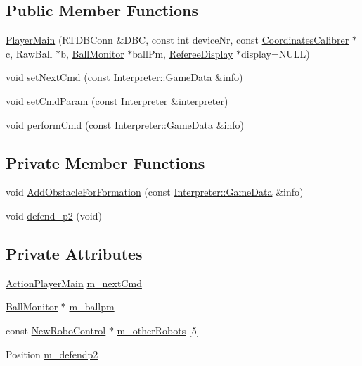\subsection*{Public Member Functions}
\begin{DoxyCompactItemize}
\item 
\hyperlink{classPlayerMain_a12957aeecc6902370f03ff2ffbb0551d}{PlayerMain} (RTDBConn \&DBC, const int deviceNr, const \hyperlink{classCoordinatesCalibrer}{CoordinatesCalibrer} $\ast$c, RawBall $\ast$b, \hyperlink{classBallMonitor}{BallMonitor} $\ast$ballPm, \hyperlink{classRefereeDisplay}{RefereeDisplay} $\ast$display=NULL)
\item 
void \hyperlink{classPlayerMain_a8f0320189df15529662c7f16d2f74084}{setNextCmd} (const \hyperlink{structInterpreter_1_1GameData}{Interpreter::GameData} \&info)
\item 
void \hyperlink{classPlayerMain_a5c4af159392663660f91809052422945}{setCmdParam} (const \hyperlink{classInterpreter}{Interpreter} \&interpreter)
\item 
void \hyperlink{classPlayerMain_af12a95c226ce973056681a138b55fb6c}{performCmd} (const \hyperlink{structInterpreter_1_1GameData}{Interpreter::GameData} \&info)
\end{DoxyCompactItemize}
\subsection*{Private Member Functions}
\begin{DoxyCompactItemize}
\item 
void \hyperlink{classPlayerMain_a978b3ce16f5d8e5d1cb9ef70f387227e}{AddObstacleForFormation} (const \hyperlink{structInterpreter_1_1GameData}{Interpreter::GameData} \&info)
\item 
void \hyperlink{classPlayerMain_a64e1d5734e07cfa82b2571aa11bb4f9d}{defend\_\-p2} (void)
\end{DoxyCompactItemize}
\subsection*{Private Attributes}
\begin{DoxyCompactItemize}
\item 
\hyperlink{classPlayerMain_af07f952a547b2902a452c1413f26dae2}{ActionPlayerMain} \hyperlink{classPlayerMain_a038f8616ec79dd26bae8039b6ada8321}{m\_\-nextCmd}
\item 
\hyperlink{classBallMonitor}{BallMonitor} $\ast$ \hyperlink{classPlayerMain_aea071084f1a844ceafac3621ffb5c320}{m\_\-ballpm}
\item 
const \hyperlink{classNewRoboControl}{NewRoboControl} $\ast$ \hyperlink{classPlayerMain_a020813a869e52dc7368ba9216b10e3d8}{m\_\-otherRobots} \mbox{[}5\mbox{]}
\item 
Position \hyperlink{classPlayerMain_a859b462c123135acc3ad88b092429611}{m\_\-defendp2}
\end{DoxyCompactItemize}


